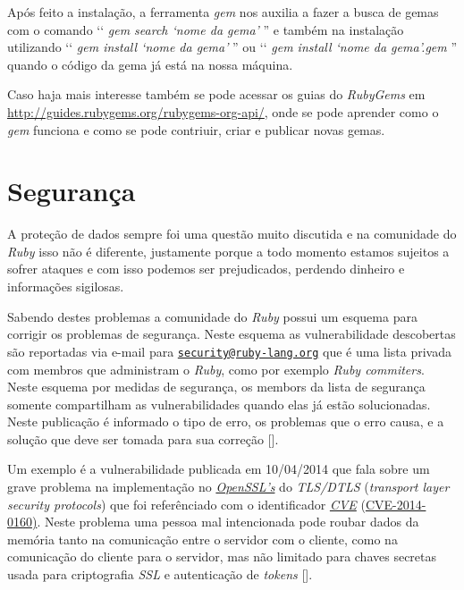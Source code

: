 Após feito a instalação, a ferramenta \emph{gem} nos auxilia a fazer a busca de gemas com o comando
‘‘ \emph{gem search ‘nome da gema' }'' e também na instalação utilizando ‘‘ \emph{gem install ‘nome
da gema' }'' ou ‘‘ \emph{gem install ‘nome da gema'.gem }'' quando o código da gema já está na nossa máquina.

Caso haja mais interesse também se pode acessar os guias do \emph{RubyGems} em
\url{http://guides.rubygems.org/rubygems-org-api/}, onde se pode aprender como o \emph{gem} funciona e como
se pode contriuir, criar e publicar novas gemas.

\section{Segurança}
\label{segurança_ruby}

A proteção de dados sempre foi uma questão muito discutida e na comunidade do \emph{Ruby} isso não é
diferente, justamente porque a todo momento estamos sujeitos a sofrer ataques e com isso podemos ser
prejudicados, perdendo dinheiro e informações sigilosas.

Sabendo destes problemas a comunidade do \emph{Ruby} possui um esquema para corrigir os problemas de
segurança. Neste esquema as vulnerabilidade descobertas são reportadas via e-mail para
\href{mailto:security@ruby-lang.org}{\nolinkurl{security@ruby-lang.org}} que é uma lista privada com
membros que administram o \emph{Ruby}, como por exemplo \emph{Ruby commiters}. Neste esquema por medidas
de segurança, os membors da lista de segurança somente compartilham as vulnerabilidades quando elas já
estão solucionadas. Neste publicação é informado o tipo de erro, os problemas que o erro causa, e a
solução que deve ser tomada para
sua correção [].

Um exemplo é a vulnerabilidade publicada em 10/04/2014 que fala sobre um grave problema na
implementação no \emph{\href{https://www.openssl.org}{OpenSSL’s}} do \emph{TLS/DTLS} (\emph{transport
layer security protocols}) que foi referênciado com o identificador \emph{\href{https://cve.mitre.org/}{CVE}}
(\href{https://web.nvd.nist.gov/view/vuln/detail?vulnId=CVE-2014-0160}{CVE-2014-0160)}. Neste problema
uma pessoa mal intencionada pode roubar dados da memória tanto na comunicação entre o servidor com o cliente,
como na comunicação do cliente para o servidor, mas não limitado para chaves secretas usada para criptografia
\emph{SSL} e autenticação de \emph{tokens} [].

